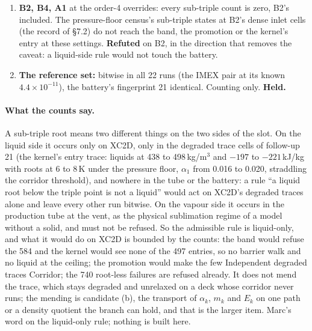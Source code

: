 \documentclass[11pt,a4paper]{article}
\begin{document}
\begin{enumerate}[nosep]
      triple-point pressure and temperature, which for a vapour is the
      sublimation regime, a real state the model continues on the vapour
      branch because it has no solid phase.  Not a degraded trace, and
      not the liquid's question.  \textbf{Refuted} on
      the tube's vapour, and the refutation is a finding about the
      production run.
\item \textbf{B2, B4, A1} at the order-4 overrides: every sub-triple
      count is zero, B2's included.  The pressure-floor census's
      sub-triple states at B2's dense inlet cells (the record of
      \S7.2) do not reach the band, the promotion or the kernel's entry
      at these settings.  \textbf{Refuted} on B2, in the direction that
      removes the caveat: a liquid-side rule would not touch the
      battery.
\item \textbf{The reference set:} bitwise in all 22 runs (the IMEX pair at its known $4.4\times10^{-11}$), the battery's fingerprint 21 identical.  Counting only.  \textbf{Held.}
\end{enumerate}

\paragraph{What the counts say.}  A sub-triple root means two
different things on the two sides of the slot.  On the liquid side it
occurs only on XC2D, only in the degraded trace cells of follow-up 21
(the kernel's entry trace: liquids at 438 to 498\,kg/m$^3$ and $-197$
to $-221$\,kJ/kg with roots at 6 to 8\,K under the pressure floor,
$\alpha_1$ from 0.016 to 0.020, straddling the corridor threshold), and
nowhere in the tube or the battery: a rule ``a liquid root below the
triple point is not a liquid'' would act on XC2D's degraded traces
alone and leave every other run bitwise.  On the vapour side it occurs
in the production tube at the vent, as the physical sublimation regime
of a model without a solid, and must not be refused.  So the admissible
rule is liquid-only, and what it would do on XC2D is bounded by the
counts: the band would refuse the 584 and the kernel would see none of
the 497 entries, so no barrier walk and no liquid at the ceiling; the
promotion would make the few Independent degraded traces Corridor; the
740 root-less failures are refused already.  It does not mend the
trace, which stays degraded and unrelaxed on a deck whose corridor
never runs; the mending is candidate (b), the transport of
$\alpha_k$, $m_k$ and $E_k$ on one path or a density quotient the branch
can hold, and that is the larger item.  Marc's word on the liquid-only
rule; nothing is built here.
\end{document}
